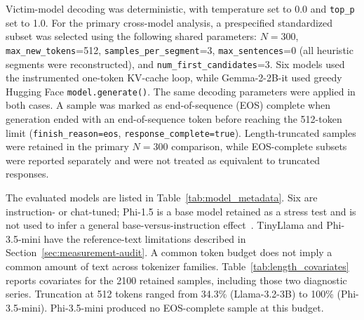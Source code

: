 \documentclass[electronics,article,submit,pdftex,moreauthors]{Definitions/mdpi}
\begin{document}
Victim-model decoding was deterministic, with temperature set to 0.0 and \texttt{top\_p} set to 1.0. For the primary cross-model analysis, a prespecified standardized subset was selected using the following shared parameters: $N=300$, \texttt{max\_new\_tokens}=512, \texttt{samples\_per\_segment}=3, \texttt{max\_sentences}=0 (all heuristic segments were reconstructed), and \texttt{num\_first\_candidates}=3. Six models used the instrumented one-token KV-cache loop, while Gemma-2-2B-it used greedy Hugging Face \texttt{model.generate()}. The same decoding parameters were applied in both cases. A sample was marked as end-of-sequence (EOS) complete when generation ended with an end-of-sequence token before reaching the 512-token limit (\texttt{finish\_reason=eos}, \texttt{response\_complete=true}). Length-truncated samples were retained in the primary $N=300$ comparison, while EOS-complete subsets were reported separately and were not treated as equivalent to truncated responses.

The evaluated models are listed in Table~\ref{tab:model_metadata}. Six are instruction- or chat-tuned; Phi-1.5 is a base model retained as a stress test and is not used to infer a general base-versus-instruction effect~\cite{qwen25report,llama3report,llama32blog,gemma2report,phi15report,tinyllama2024,phi3report}. TinyLlama and Phi-3.5-mini have the reference-text limitations described in Section~\ref{sec:measurement-audit}. A common token budget does not imply a common amount of text across tokenizer families. Table~\ref{tab:length_covariates} reports covariates for the 2100 retained samples, including those two diagnostic series. Truncation at 512 tokens ranged from 34.3\% (Llama-3.2-3B) to 100\% (Phi-3.5-mini). Phi-3.5-mini produced no EOS-complete sample at this budget.

\begin{table}[ht]
\centering
\caption{Victim models in the retained campaign. TinyLlama and Phi-3.5-mini are apparatus diagnostics because of unresolved reference detokenization. Parameter counts follow the cited model cards and technical reports.}
\label{tab:model_metadata}
\end{table}
\end{document}
